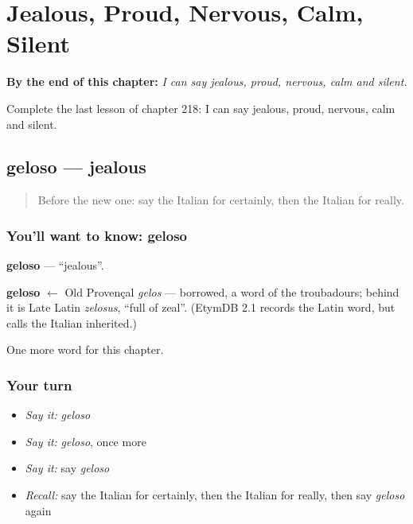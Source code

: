 
\chapter{Jealous, Proud, Nervous, Calm, Silent}
\label{ch:it-jealous-proud-nervous-calm-silent}

\begin{chapteropening}
\textbf{By the end of this chapter:} \emph{I can say jealous, proud, nervous, calm and silent.}

Complete the last lesson of chapter 218: I can say jealous, proud, nervous, calm and silent.
\end{chapteropening}

\section[geloso]{geloso — jealous}

\label{lesson:IT-C218-geloso}



\begin{quote}
Before the new one: say the Italian for certainly, then the Italian for really.
\end{quote}

\subsection*{You'll want to know: geloso}
\textbf{geloso} — \textquotedblleft{}jealous\textquotedblright{}.

\begin{cousinweb}
\textbf{geloso} $\leftarrow$ Old Provençal \emph{gelos} — borrowed, a word of the troubadours; behind it is Late Latin \emph{zelosus}, \textquotedblleft{}full of zeal\textquotedblright{}. (EtymDB 2.1 records the Latin word, but calls the Italian inherited.)
\end{cousinweb}

\begin{grammarlens}[title={What you've built}]
One more word for this chapter.
\end{grammarlens}

\subsection*{Your turn}
\begin{itemize}
\raggedright
  \item \emph{Say it:} \emph{geloso}
  \item \emph{Say it:} \emph{geloso}, once more
  \item \emph{Say it:} say \emph{geloso}
  \item \emph{Recall:} say the Italian for certainly, then the Italian for really, then say \emph{geloso} again
\end{itemize}

